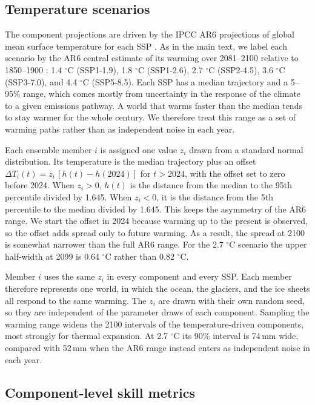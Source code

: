 \documentclass[12pt]{article}
\begin{document}
\subsection{Temperature scenarios}

The component projections are driven by the IPCC AR6 projections of global mean surface temperature for each SSP \citep{Lee2021}. As in the main text, we label each scenario by the AR6 central estimate of its warming over 2081--2100 relative to 1850--1900 \citep[][Table~4.5]{Lee2021}: 1.4 $^\circ$C (SSP1-1.9), 1.8 $^\circ$C (SSP1-2.6), 2.7 $^\circ$C (SSP2-4.5), 3.6 $^\circ$C (SSP3-7.0), and 4.4 $^\circ$C (SSP5-8.5). Each SSP has a median trajectory and a 5--95\% range, which comes mostly from uncertainty in the response of the climate to a given emissions pathway. A world that warms faster than the median tends to stay warmer for the whole century. We therefore treat this range as a set of warming paths rather than as independent noise in each year.

Each ensemble member $i$ is assigned one value $z_i$ drawn from a standard normal distribution. Its temperature is the median trajectory plus an offset $\Delta T_i(t) = z_i\,[h(t) - h(2024)]$ for $t > 2024$, with the offset set to zero before 2024. When $z_i > 0$, $h(t)$ is the distance from the median to the 95th percentile divided by 1.645. When $z_i < 0$, it is the distance from the 5th percentile to the median divided by 1.645. This keeps the asymmetry of the AR6 range. We start the offset in 2024 because warming up to the present is observed, so the offset adds spread only to future warming. As a result, the spread at 2100 is somewhat narrower than the full AR6 range. For the 2.7 $^\circ$C scenario the upper half-width at 2099 is 0.64 $^\circ$C rather than 0.82 $^\circ$C.

Member $i$ uses the same $z_i$ in every component and every SSP. Each member therefore represents one world, in which the ocean, the glaciers, and the ice sheets all respond to the same warming. The $z_i$ are drawn with their own random seed, so they are independent of the parameter draws of each component. Sampling the warming range widens the 2100 intervals of the temperature-driven components, most strongly for thermal expansion. At 2.7 $^\circ$C its 90\% interval is 74\,mm wide, compared with 52\,mm when the AR6 range instead enters as independent noise in each year.



\subsection{Component-level skill metrics}
\label{s:skill_metrics}
\end{document}

